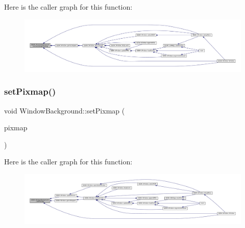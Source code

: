 Here is the caller graph for this function\+:
\nopagebreak
\begin{figure}[H]
\begin{center}
\leavevmode
\includegraphics[width=350pt]{class_q_g_b_a_1_1_window_background_a53952d8416bfb418c1c44bb46379ce92_icgraph}
\end{center}
\end{figure}
\mbox{\label{class_q_g_b_a_1_1_window_background_ab7e1ca3a613b5adda53295f2dfc2f9a4}} 
\subsubsection{\texorpdfstring{set\+Pixmap()}{setPixmap()}}
{\footnotesize\ttfamily void Window\+Background\+::set\+Pixmap (\begin{DoxyParamCaption}\item[{const Q\+Pixmap \&}]{pixmap }\end{DoxyParamCaption})}

Here is the caller graph for this function\+:
\nopagebreak
\begin{figure}[H]
\begin{center}
\leavevmode
\includegraphics[width=350pt]{class_q_g_b_a_1_1_window_background_ab7e1ca3a613b5adda53295f2dfc2f9a4_icgraph}
\end{center}
\end{figure}
\mbox{\label{class_q_g_b_a_1_1_window_background_a037a6e2b520926ee2bb6aa4ce864aa11}} 
